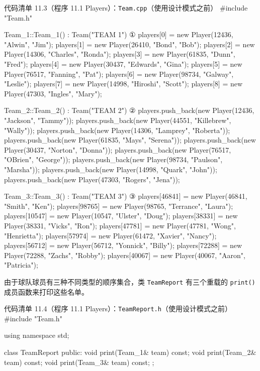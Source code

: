 \begin{codeboxt}{代码清单 11.3（程序 11.1 Players）：\texttt{Team.cpp}（使用设计模式之前）}
#include "Team.h"

Team_1::Team_1() : Team("TEAM 1")   ①
{
    players[0] = new Player(12436, "Alwin", "Jim");
    players[1] = new Player(26410, "Bond", "Bob");
    players[2] = new Player(14306, "Charles", "Ronda");
    players[3] = new Player(61835, "Dunn", "Fred");
    players[4] = new Player(30437, "Edwards", "Gina");
    players[5] = new Player(76517, "Fanning", "Pat");
    players[6] = new Player(98734, "Galway", "Leslie");
    players[7] = new Player(14998, "Hiroshi", "Scott");
    players[8] = new Player(47303, "Ingles", "Mary");
}

Team_2::Team_2() : Team("TEAM 2")   ②
{
    players.push_back(new Player(12436, "Jackson", "Tammy"));
    players.push_back(new Player(44551, "Killebrew", "Wally"));
    players.push_back(new Player(14306, "Lamprey", "Roberta"));
    players.push_back(new Player(61835, "Mays", "Serena"));
    players.push_back(new Player(30437, "Norton", "Donna"));
    players.push_back(new Player(76517, "OBrien", "George"));
    players.push_back(new Player(98734, "Paulson", "Marsha"));
    players.push_back(new Player(14998, "Quark", "John"));
    players.push_back(new Player(47303, "Rogers", "Jena"));
}

Team_3::Team_3() : Team("TEAM 3")   ③
{
    players[46841] = new Player(46841, "Smith", "Ken");
    players[98765] = new Player(98765, "Terrance", "Laura");
    players[10547] = new Player(10547, "Ulster", "Doug");
    players[38331] = new Player(38331, "Vicks", "Ron");
    players[47781] = new Player(47781, "Wong", "Henrietta");
    players[57974] = new Player(61472, "Xavier", "Nancy");
    players[56712] = new Player(56712, "Yonnick", "Billy");
    players[72288] = new Player(72288, "Zachs", "Robby");
    players[40067] = new Player(40067, "Aaron", "Patricia");
}
\end{codeboxt}
\par
{}\par
{}\par

由于球队球员有三种不同类型的顺序集合，类 \texttt{Team\allowbreak{}Report} 有三个重载的 \texttt{print()} 成员函数来打印这些名单。

\begin{codeboxt}{代码清单 11.4（程序 11.1 Players）：\texttt{Team\allowbreak{}Report.\allowbreak{}h}（使用设计模式之前）}
#include "Team.h"

using namespace std;

class TeamReport
{
public:
    void print(Team_1& team) const;
    void print(Team_2& team) const;
    void print(Team_3& team) const;
};
\end{codeboxt}

